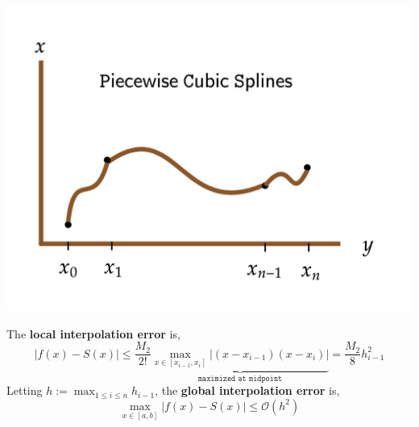\begin{marginfigure}
\begin{center}
           \includegraphics[width=\textwidth]{figures/fig-20.png}
    \end{center}
\end{marginfigure}

\begin{rmk}
     The \textbf{local interpolation error} is,
     \[|f(x)-S(x)| \leq \frac{M_2}{2 !} \underbrace{\max _{x \in\left[x_{i-1}, x_i\right]}\left|\left(x-x_{i-1}\right)\left(x-x_i\right)\right|}_{\texttt {maximized at midpoint}}=\frac{M_2}{8} h_{i-1}^2\]
     Letting $h:=\max _{1 \leq i \leq n} h_{i-1}$, the \textbf{global interpolation error} is,
     \[\max _{x \in[a, b]}|f(x)-S(x)| \leq \mathcal{O}(h^2)\]
\end{rmk}

\LineBreak

